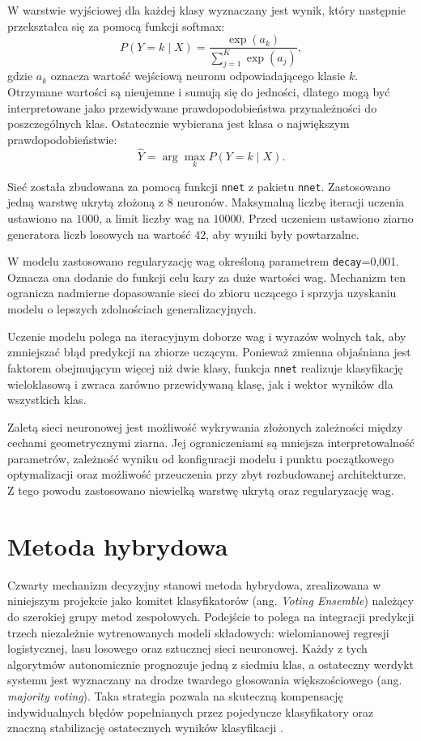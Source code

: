 \documentclass{report}
\begin{document}
W warstwie wyjściowej dla każdej klasy wyznaczany jest wynik, który następnie przekształca się za pomocą funkcji softmax:
\[
P(Y=k\mid X)=\frac{\exp(a_k)}{\sum_{j=1}^{K}\exp(a_j)},
\]
gdzie $a_k$ oznacza wartość wejściową neuronu odpowiadającego klasie $k$. Otrzymane wartości są nieujemne i sumują się do jedności, dlatego mogą być interpretowane jako przewidywane prawdopodobieństwa przynależności do poszczególnych klas. Ostatecznie wybierana jest klasa o największym prawdopodobieństwie:
\[
\hat{Y}=\arg\max_k P(Y=k\mid X).
\]

Sieć została zbudowana za pomocą funkcji \texttt{nnet} z pakietu \texttt{nnet}. Zastosowano jedną warstwę ukrytą złożoną z $8$ neuronów. Maksymalną liczbę iteracji uczenia ustawiono na $1000$, a limit liczby wag na $10000$. Przed uczeniem ustawiono ziarno generatora liczb losowych na wartość $42$, aby wyniki były powtarzalne.

W modelu zastosowano regularyzację wag określoną parametrem \texttt{decay}=0{,}001. Oznacza ona dodanie do funkcji celu kary za duże wartości wag. Mechanizm ten ogranicza nadmierne dopasowanie sieci do zbioru uczącego i sprzyja uzyskaniu modelu o lepszych zdolnościach generalizacyjnych.

Uczenie modelu polega na iteracyjnym doborze wag i wyrazów wolnych tak, aby zmniejszać błąd predykcji na zbiorze uczącym. Ponieważ zmienna objaśniana jest faktorem obejmującym więcej niż dwie klasy, funkcja \texttt{nnet} realizuje klasyfikację wieloklasową i zwraca zarówno przewidywaną klasę, jak i wektor wyników dla wszystkich klas.

Zaletą sieci neuronowej jest możliwość wykrywania złożonych zależności między cechami geometrycznymi ziarna. Jej ograniczeniami są mniejsza interpretowalność parametrów, zależność wyniku od konfiguracji modelu i punktu początkowego optymalizacji oraz możliwość przeuczenia przy zbyt rozbudowanej architekturze. Z tego powodu zastosowano niewielką warstwę ukrytą oraz regularyzację wag.


\section{Metoda hybrydowa}
Czwarty mechanizm decyzyjny stanowi metoda hybrydowa, zrealizowana w niniejszym projekcie jako komitet klasyfikatorów (ang. \textit{Voting Ensemble}) należący do szerokiej grupy metod zespołowych. Podejście to polega na integracji predykcji trzech niezależnie wytrenowanych modeli składowych: wielomianowej regresji logistycznej, lasu losowego oraz sztucznej sieci neuronowej. Każdy z tych algorytmów autonomicznie prognozuje jedną z siedmiu klas, a ostateczny werdykt systemu jest wyznaczany na drodze twardego głosowania większościowego (ang. \textit{majority voting}). Taka strategia pozwala na skuteczną kompensację indywidualnych błędów popełnianych przez pojedyncze klasyfikatory oraz znaczną stabilizację ostatecznych wyników klasyfikacji \cite{hastie2009}.
\end{document}

